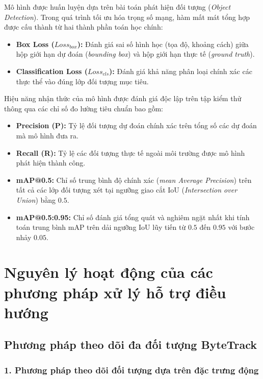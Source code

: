 Mô hình được huấn luyện dựa trên bài toán phát hiện đối tượng (\textit{Object Detection}). Trong quá trình tối ưu hóa trọng số mạng, hàm mất mát tổng hợp được cấu thành từ hai thành phần toán học chính:
\begin{itemize}
    \item \textbf{Box Loss ($Loss_{box}$):} Đánh giá sai số hình học (tọa độ, khoảng cách) giữa hộp giới hạn dự đoán (\textit{bounding box}) và hộp giới hạn thực tế (\textit{ground truth}).
    \item \textbf{Classification Loss ($Loss_{cls}$):} Đánh giá khả năng phân loại chính xác các thực thể vào đúng lớp đối tượng mục tiêu.
\end{itemize}

Hiệu năng nhận thức của mô hình được đánh giá độc lập trên tập kiểm thử thông qua các chỉ số đo lường tiêu chuẩn bao gồm:
\begin{itemize}
    \item \textbf{Precision (P):} Tỷ lệ đối tượng dự đoán chính xác trên tổng số các dự đoán mà mô hình đưa ra.
    \item \textbf{Recall (R):} Tỷ lệ các đối tượng thực tế ngoài môi trường được mô hình phát hiện thành công.
    \item \textbf{mAP@0.5:} Chỉ số trung bình độ chính xác (\textit{mean Average Precision}) trên tất cả các lớp đối tượng xét tại ngưỡng giao cắt IoU (\textit{Intersection over Union}) bằng $0.5$.
    \item \textbf{mAP@0.5:0.95:} Chỉ số đánh giá tổng quát và nghiêm ngặt nhất khi tính toán trung bình mAP trên dải ngưỡng IoU lũy tiến từ $0.5$ đến $0.95$ với bước nhảy $0.05$.
\end{itemize}

\section{Nguyên lý hoạt động của các phương pháp xử lý hỗ trợ điều hướng}

\subsection{Phương pháp theo dõi đa đối tượng ByteTrack}

\subsubsection*{1. Phương pháp theo dõi đối tượng dựa trên đặc trưng động}

